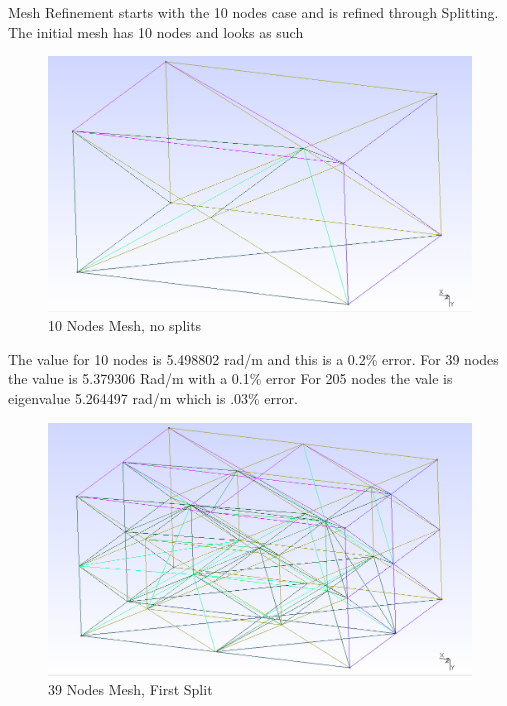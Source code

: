 \documentclass[11pt,a4paper,oldfontcommands]{memoir}
\begin{document}
Mesh Refinement starts with the 10 nodes case and is refined through Splitting.
The initial mesh has 10 nodes and looks as such

\begin{figure}
  \includegraphics[width=\linewidth]{10Nodes.PNG}
  \caption{10 Nodes Mesh, no splits}
  \label{fig:mesh10}
\end{figure}

The value for 10 nodes is 5.498802 rad/m and this is a 0.2\%  error.
For 39 nodes the value is 5.379306 Rad/m with a 0.1\% error
For 205 nodes the vale is eigenvalue 5.264497 rad/m which is .03\% error.

\begin{figure}
  \includegraphics[width=\linewidth]{39Nodes.PNG}
  \caption{39 Nodes Mesh, First Split}
  \label{fig:mesh39}
\end{figure}
\end{document}
